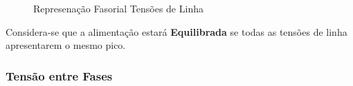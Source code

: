 \documentclass{article}
\begin{document}
\begin{definition}
\begin{figure}[H]
                        \caption{Represenação Fasorial Tensões de Linha}
                    \end{figure}\noindent
                Considera-se que a alimentação estará \textbf{Equilibrada} se todas as tensões de linha apresentarem o mesmo pico.
            \end{definition}

        \subsubsection{Tensão entre Fases}
            \begin{definition}
                
            \end{definition}
\end{document}
